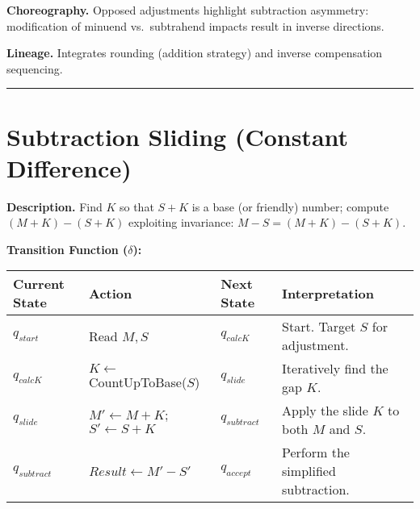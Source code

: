 \documentclass[
]{article}
\begin{document}
\textbf{Choreography.} Opposed adjustments highlight subtraction
asymmetry: modification of minuend vs.~subtrahend impacts result in
inverse directions.

\textbf{Lineage.} Integrates rounding (addition strategy) and inverse
compensation sequencing.

\begin{center}\rule{0.5\linewidth}{0.5pt}\end{center}

\section{Subtraction Sliding (Constant
Difference)}\label{subtraction-sliding-constant-difference}

\textbf{Description.} Find \(K\) so that \(S + K\) is a base (or
friendly) number; compute \((M + K) - (S + K)\) exploiting invariance:
\(M - S = (M+K) - (S+K)\).

\textbf{Transition Function (\(\delta\)):}

\begin{longtable}[]{@{}
  >{\raggedright\arraybackslash}p{}
  >{\raggedright\arraybackslash}p{}
  >{\raggedright\arraybackslash}p{}
  >{\raggedright\arraybackslash}p{}@{}}
\toprule\noalign{}
\begin{minipage}[b]{\linewidth}\raggedright
Current State
\end{minipage} & \begin{minipage}[b]{\linewidth}\raggedright
Action
\end{minipage} & \begin{minipage}[b]{\linewidth}\raggedright
Next State
\end{minipage} & \begin{minipage}[b]{\linewidth}\raggedright
Interpretation
\end{minipage} \\
\midrule\noalign{}
\endhead
\bottomrule\noalign{}
\endlastfoot
\(q_{start}\) & Read \(M, S\) & \(q_{calcK}\) & Start. Target \(S\) for
adjustment. \\
\(q_{calcK}\) & \(K \leftarrow\) CountUpToBase(\(S\)) & \(q_{slide}\) &
Iteratively find the gap \(K\). \\
\(q_{slide}\) & \(M' \leftarrow M+K\); \(S' \leftarrow S+K\) &
\(q_{subtract}\) & Apply the slide \(K\) to both \(M\) and \(S\). \\
\(q_{subtract}\) & \(Result \leftarrow M' - S'\) & \(q_{accept}\) &
Perform the simplified subtraction. \\
\end{longtable}
\end{document}
